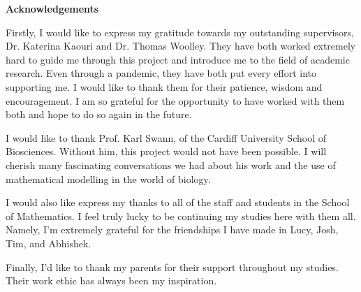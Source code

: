 \newpage
\thispagestyle{plain}
    \LARGE
    \textbf{Acknowledgements}
    \vspace{2cm}
    \normalsize
   
    Firstly, I would like to express my gratitude towards my outstanding supervisors, Dr. Katerina Kaouri and Dr. Thomas Woolley. They have both worked extremely hard to guide me through this project and introduce me to the field of academic research. Even through a pandemic, they have both put every effort into supporting me. I would like to thank them for their patience, wisdom and encouragement. I am so grateful for the opportunity to have worked with them both and hope to do so again in the future.
    
    I would like to thank Prof. Karl Swann, of the Cardiff University School of Biosciences. Without him, this project would not have been possible. I will cherish many fascinating conversations we had about his work and the use of mathematical modelling in the world of biology.
    
    I would also like express my thanks to all of the staff and students in the School of Mathematics. I feel truly lucky to be continuing my studies here with them all. Namely, I'm extremely grateful for the friendships I have made in Lucy, Josh, Tim, and  Abhishek.
    
    Finally, I'd like to thank my parents for their support throughout my studies. Their work ethic has always been my inspiration.